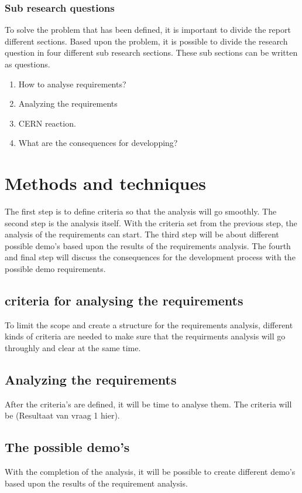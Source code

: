 \documentclass[paper=a4, fontsize=11pt,twoside]{scrartcl}	%
\begin{document}
\subsubsection{Sub research questions}
To solve the problem that has been defined, it is important to divide the report different sections. Based upon the problem, it is possible to divide the research question in four different sub research sections. These sub sections can be written as questions. 
\begin{enumerate}
\item How to analyse requirements?
\item Analyzing the requirements
\item CERN reaction.
\item What are the consequences for developping?
\end{enumerate}



\newpage
\section{Methods and techniques}
 
The first step is to define criteria so that the analysis will go smoothly. 
The second step is the analysis itself. With the criteria set from the previous step, the analysis of the requirements can start. 
The third step will be about different possible demo's based upon the results of the requirements analysis. 
The fourth and final step will discuss the consequences for the development process with the possible demo requirements.

\subsection{ criteria for analysing the requirements}
To limit the scope and create a structure for the requirements analysis, different kinds of criteria are needed to make sure that the requirments analysis will go throughly and clear at the same time. 

\subsection{Analyzing the requirements}
After the criteria's are defined, it will be time to analyse them. The criteria will be (Resultaat van vraag 1 hier).

\subsection{The possible demo's}
With the completion of the analysis, it will be possible to create different demo's based upon the results of the requirement analysis.
\end{document}

